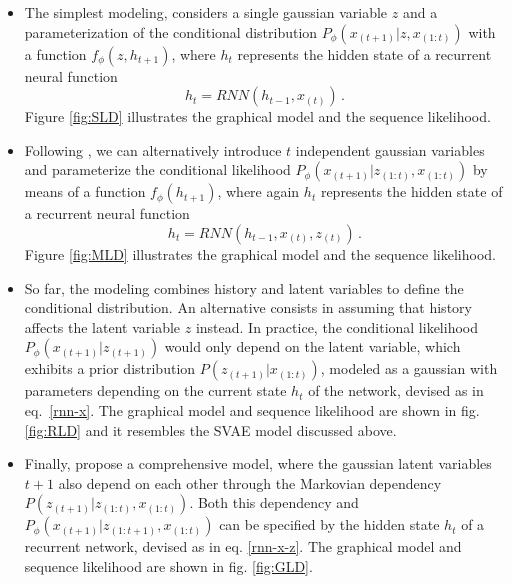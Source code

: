 \documentclass[sigconf]{acmart}
\newcommand{\bs}[1]{\ensuremath{\bm{\mathit{#1}}}}
\numberwithin{equation}{section}
\begin{document}
\begin{itemize}
\item The simplest modeling, considers a single gaussian variable
  \bs{z} and a parameterization of the conditional distribution 
$P_\phi\left(\bs{x}_{(t+1)}| \bs{z},\bs{x}_{(1:t)}\right)$ with a function
$f_\phi(\bs{z}, \bs{h}_{t+1})$, where $\bs{h}_t$ represents the hidden
state of a recurrent neural function 
\begin{equation}\label{rnn-x}
  \bs{h}_t = \mathit{RNN}\left(\bs{h}_{t-1}, \bs{x}_{(t)}\right) \, .
\end{equation}
Figure \ref{fig:SLD} illustrates the graphical model and the sequence
likelihood.
\item Following \cite{BayerO14a}, we can alternatively introduce $t$
  independent gaussian variables and parameterize
  the conditional likelihood
$P_\phi\left(\bs{x}_{(t+1)}|
  \bs{z}_{(1:t)},\bs{x}_{(1:t)}\right)
$
by means of a function 
$f_\phi(\bs{h}_{t+1})$, where again $\bs{h}_t$ represents the hidden
state of a recurrent neural function 
\begin{equation}\label{rnn-x-z}
  \bs{h}_t = \mathit{RNN}\left(\bs{h}_{t-1}, \bs{x}_{(t)}, \bs{z}_{(t)}\right) \, .
\end{equation}
Figure \ref{fig:MLD} illustrates the graphical model and the sequence
likelihood. 
\item So far, the modeling combines history and latent variables to
  define the conditional distribution. An alternative consists in
  assuming that history affects the latent variable \bs{z} instead. In
  practice, the conditional 
  likelihood $P_\phi\left(\bs{x}_{(t+1)}| \bs{z}_{(t+1)}\right)$ would
  only depend on the latent variable, which exhibits a prior distribution
  $P\left(\bs{z}_{(t+1)}|\bs{x}_{(1:t)}\right)$, modeled as a gaussian
  with parameters depending on the current state $\bs{h}_t$ of the
  network, devised as in eq.~\ref{rnn-x}. The graphical model and
  sequence likelihood are shown in fig. \ref{fig:RLD} and it
  resembles the SVAE model discussed above. 
\item Finally, \cite{Chung:2015:RLV:2969442.2969572} propose a comprehensive
  model, where the gaussian latent variables $t+1$ also depend on each
  other through the Markovian dependency $P\left(\bs{z}_{(t+1)}|\bs{z}_{(1:t)},
    \bs{x}_{(1:t)}\right)$. Both this dependency and 
  $P_\phi\left(\bs{x}_{(t+1)}| \bs{z}_{(1:t+1)}, \bs{x}_{(1:t)}\right)$ can be specified by
  the hidden state $\bs{h}_{t}$ of a recurrent network, devised as in
  eq. \ref{rnn-x-z}.  The graphical model and
  sequence likelihood are shown in fig. \ref{fig:GLD}. 
\end{itemize}
\end{document}
